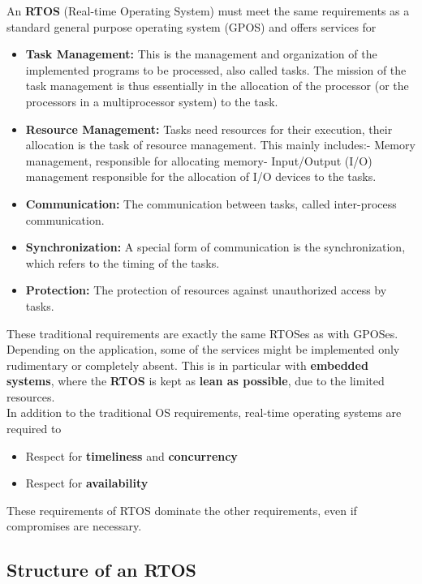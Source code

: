 An \textbf{RTOS} (Real-time Operating System) must meet the same requirements as a standard general purpose operating system (GPOS) and offers services for

\begin{itemize}
\item  \textbf{Task Management: }This is the management and organization of the implemented programs to be processed, also called tasks. The mission of the task management is thus essentially in the allocation of the processor (or the processors in a multiprocessor system) to the task.
\item  \textbf{Resource Management: }Tasks need resources for their execution, their allocation is the task of resource management. This mainly includes:- Memory management, responsible for allocating memory- Input/Output (I/O) management responsible for the allocation of I/O devices to  the tasks.
\item  \textbf{Communication: }The communication between tasks, called inter-process communication.
\item  \textbf{Synchronization: }A special form of communication is the synchronization, which refers to the timing of the tasks.
\item  \textbf{Protection: }The protection of resources against unauthorized access by tasks.
\end{itemize}

These traditional requirements are exactly the same RTOSes as with GPOSes. Depending on the application, some of the services might be implemented only  rudimentary or completely absent. This is in particular with \textbf{embedded} \textbf{systems}, where the \textbf{RTOS} is kept as \textbf{lean as possible}, due to the limited resources.\\

In addition to the traditional OS requirements, real-time operating systems are required to 

\begin{itemize}
	\item  Respect for \textbf{timeliness} and \textbf{concurrency}
	\item  Respect for \textbf{availability}
\end{itemize}

These requirements of RTOS dominate the other requirements, even if compromises are necessary.

\subsection{Structure of an RTOS}

